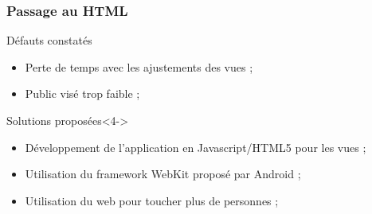 \documentclass{beamer}
\def\android{Android\texttrademark}
\begin{document}
\begin{frame}
  \frametitle{Passage au HTML}
  \begin{alertblock}{Défauts constatés}
    \begin{itemize}
    \item<2-> Perte de temps avec les ajustements des vues ;
    \item<3-> Public visé trop faible ;
    \end{itemize}
  \end{alertblock}
  \begin{block}{Solutions proposées}<4->
    \begin{itemize}
    \item<5-> Développement de l'application en Javascript/HTML5 pour les vues ;
    \item<6-> Utilisation du framework WebKit proposé par \android{} ;
    \item<7-> Utilisation du web pour toucher plus de personnes ;
    \end{itemize}
  \end{block}
\end{frame}
\end{document}
